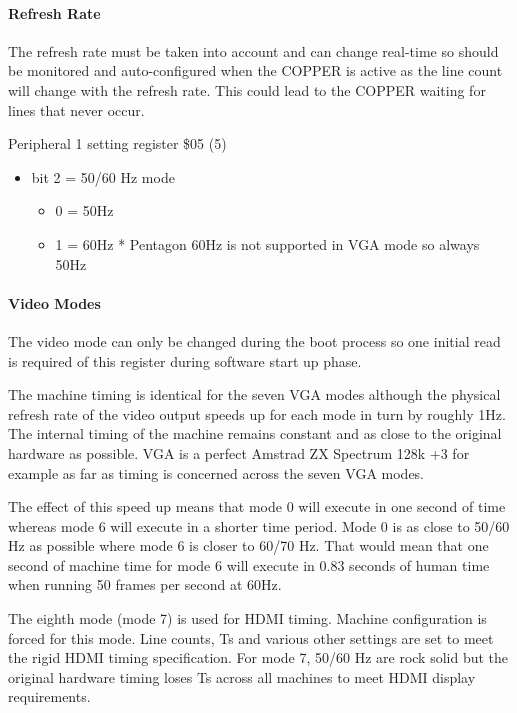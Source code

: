 \paragraph{Refresh Rate}

The refresh rate must be taken into account and can change real-time
so should be monitored and auto-configured when the COPPER is active
as the line count will change with the refresh rate. This could lead
to the COPPER waiting for lines that never occur.

Peripheral 1 setting register \$05 (5)
\begin{itemize}
\item[] bit 2 = 50/60 Hz mode
  \begin{itemize}
  \item[] 0 = 50Hz
  \item[] 1 = 60Hz * Pentagon 60Hz is not supported in VGA mode so always 50Hz
  \end{itemize}
\end{itemize}

\paragraph{Video Modes}

The video mode can only be changed during the boot process so one
initial read is required of this register during software start up
phase.

The machine timing is identical for the seven VGA modes although the
physical refresh rate of the video output speeds up for each mode in
turn by roughly 1Hz. The internal timing of the machine remains
constant and as close to the original hardware as possible. VGA is a
perfect Amstrad ZX Spectrum 128k +3 for example as far as timing is
concerned across the seven VGA modes.

The effect of this speed up means that mode 0 will execute in one
second of time whereas mode 6 will execute in a shorter time
period. Mode 0 is as close to 50/60 Hz as possible where mode 6 is
closer to 60/70 Hz. That would mean that one second of machine time
for mode 6 will execute in 0.83 seconds of human time when running 50
frames per second at 60Hz.

The eighth mode (mode 7) is used for HDMI timing. Machine
configuration is forced for this mode. Line counts, Ts and various
other settings are set to meet the rigid HDMI timing
specification. For mode 7, 50/60 Hz are rock solid but the original
hardware timing loses Ts across all machines to meet HDMI display
requirements.

